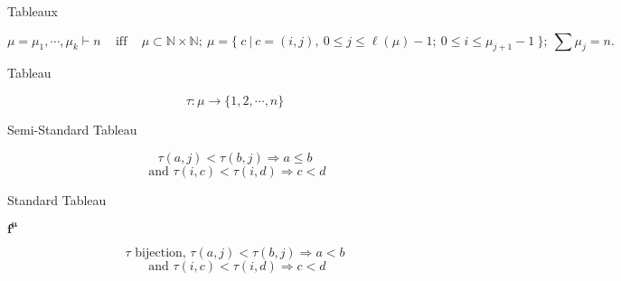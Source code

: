 \documentclass[12pt]{amsart}
\begin{document}
\vspace{-10pt}\begin{mdframed}[linecolor=red!20, linewidth=3pt]
\begin{center}\begin{bf}Tableaux\end{bf}\end{center}
 \[\mu=\mu_1, \cdots, \mu_k\vdash n \hspace{10pt} \text{  iff }\hspace{10pt} \mu\subset\mathbb{N}\times\mathbb{N}; ~\mu=\{~c~| ~c=(i,j),~ 0\leq j\leq \ell(\mu)-1; ~0\leq i\leq \mu_{j+1}-1~\};~\sum \mu_j=n.\]
 

 	\begin{minipage}[t]{5cm}
 		\begin{center}\begin{bf}Tableau\end{bf} \end{center}
		 \begin{equation*}\tau:\mu \rightarrow \{1,2,\cdots,n\}\end{equation*}
	 \end{minipage}
	\begin{minipage}[t]{5.75cm}
		\begin{center} \begin{bf}Semi-Standard Tableau\end{bf} \end{center}
		 \begin{equation*}\tau(a,j)<\tau(b,j) \Rightarrow  a\leq b\end{equation*}
		 \begin{equation*}\text{ and }\tau(i,c)<\tau(i,d) \Rightarrow  c<d \end{equation*}
	 \end{minipage}
	  \begin{minipage}[t]{8cm}
		 \begin{center}\begin{bf}Standard Tableau\end{bf} $\mathbf{f^\mu}$\end{center}
		 \begin{equation*}\tau \text{ bijection, }\tau(a,j)<\tau(b,j) \Rightarrow  a<b\end{equation*}
		 \begin{equation*}\text{ and }\tau(i,c)<\tau(i,d) \Rightarrow  c<d\end{equation*}
	  \end{minipage}


\end{mdframed}
\end{document}
